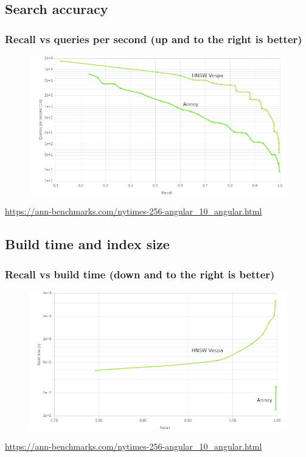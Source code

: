 \documentclass{beamer}
\begin{document}
\subsection{Search accuracy}
  \begin{frame}
    \frametitle{Recall vs queries per second (up and to the right is better)}  
  \begin{figure}[annoy_vs_hnsw_vespa_recall_vs_queries_per_sec_nytimes_labels]
    \vspace*{-0.1cm}
  	\includegraphics[scale=0.3]{annoy_vs_hnsw_vespa_recall_vs_queries_per_sec_nytimes_labels} 	
  \end{figure} 
  \vspace{-0.3cm}
  \scriptsize \centering \url{https://ann-benchmarks.com/nytimes-256-angular_10_angular.html} 
  \end{frame}




\subsection{Build time and index size}

  \begin{frame}
    \frametitle{Recall vs build time (down and to the right is better)}  
  \begin{figure}[annoy_vs_hnsw_vespa_recall_vs_build_time_nytimes_labels]
    \vspace*{-0.1cm}
  	\includegraphics[scale=0.3]{annoy_vs_hnsw_vespa_recall_vs_build_time_nytimes_labels} 	
  \end{figure} 
  \vspace{-0.3cm}
  \scriptsize \centering \url{https://ann-benchmarks.com/nytimes-256-angular_10_angular.html} 
  \end{frame}
\end{document}
